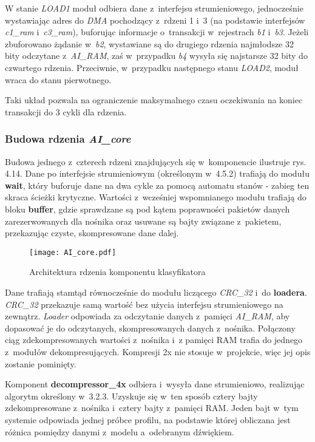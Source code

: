 W stanie \textit{LOAD1} moduł odbiera dane z~interfejsu strumieniowego, jednocześnie wystawiając adres do \textit{DMA} pochodzący z~rdzeni 1 i~3 (na podstawie interfejsów \textit{c1\_ram} i~\textit{c3\_ram}), buforując informacje o~transakcji w~rejestrach \textit{b1} i~\textit{b3}. Jeżeli zbuforowano żądanie w~\textit{b2}, wystawiane są do drugiego rdzenia najmłodsze 32 bity odczytane z~\textit{AI\_RAM}, zaś w~przypadku \textit{b4} wysyła się najstarsze 32 bity do czwartego rdzenia. Przeciwnie, w~przypadku następnego stanu \textit{LOAD2}, moduł wraca do stanu pierwotnego.

Taki układ pozwala na ograniczenie maksymalnego czasu oczekiwania na koniec transakcji do 3 cykli dla rdzenia.

\subsubsection{Budowa rdzenia \textit{AI\_core}}

Budowa jednego z~czterech rdzeni znajdujących się w~komponencie ilustruje rys. 4.14. Dane po interfejsie strumieniowym (określonym w~4.5.2) trafiają do modułu \textbf{wait}, który buforuje dane na dwa cykle za pomocą automatu stanów - zabieg ten skraca ścieżki krytyczne. Wartości z~wcześniej wspomnianego modułu trafiają do bloku \textbf{buffer}, gdzie sprawdzane są pod kątem poprawności pakietów danych zarezerwowanych dla nośnika oraz usuwane są bajty związane z~pakietem, przekazując czyste, skompresowane dane dalej.

\begin{figure}[h]
	\centering
	\texttt{[image: AI\_core.pdf]}
	\caption{Architektura rdzenia komponentu klasyfikatora}
\end{figure}

Dane trafiają stamtąd równocześnie do modułu liczącego \textit{CRC\_32} i~do \textbf{loadera}. \textit{CRC\_32} przekazuje samą wartość bez użycia interfejsu strumieniowego na zewnątrz. \textit{Loader} odpowiada za odczytanie danych z~pamięci \textit{AI\_RAM}, aby dopasować je do odczytanych, skompresowanych danych z~nośnika. Połączony ciąg zdekompresowanych wartości z~nośnika i~z pamięci RAM trafia do jednego z~modułów dekompresujących. Kompresji 2x nie stosuje w~projekcie, więc jej opis zostanie pominięty.

Komponent \textbf{decompressor\_4x} odbiera i~wysyła dane strumieniowo, realizując algorytm określony w~3.2.3. Uzyskuje się w~ten sposób cztery bajty zdekompresowane z~nośnika i~cztery bajty z~pamięci RAM. Jeden bajt w~tym systemie odpowiada jednej próbce profilu, na podstawie której obliczana jest różnica pomiędzy danymi z~modelu a~odebranym dźwiękiem.

